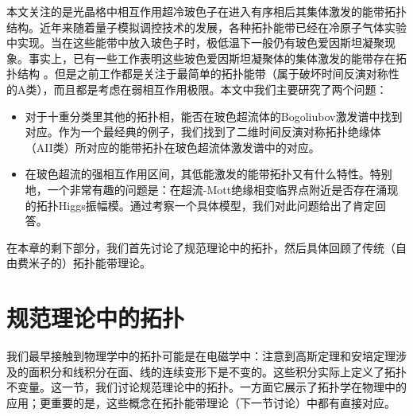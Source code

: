 本文关注的是光晶格中相互作用超冷玻色子在进入有序相后其集体激发的能带拓扑结构。近年来随着量子模拟调控技术的发展，各种拓扑能带已经在冷原子气体实验中实现\cite{Goldman2016,Cooper2019}。当在这些能带中放入玻色子时，极低温下一般仍有玻色爱因斯坦凝聚现象。事实上，已有一些工作表明这些玻色爱因斯坦凝聚体的集体激发的能带存在拓扑结构 \cite{Furukawa2015,Xu2016,Liberto2016}。但是之前工作都是关注于最简单的拓扑能带（属于破坏时间反演对称性的A类），而且都是考虑在弱相互作用极限。本文中我们主要研究了两个问题：
\begin{itemize}
    \item 对于十重分类里其他的拓扑相，能否在玻色超流体的Bogoliubov激发谱中找到对应。作为一个最经典的例子，我们找到了二维时间反演对称拓扑绝缘体（AII类）所对应的能带拓扑在玻色超流体激发谱中的对应。
    \item 在玻色超流的强相互作用区间，其低能激发的能带拓扑又有什么特性。特别地，一个非常有趣的问题是：在超流-Mott绝缘相变临界点附近是否存在涌现的拓扑Higgs振幅模。通过考察一个具体模型，我们对此问题给出了肯定回答。
\end{itemize}
在本章的剩下部分，我们首先讨论了规范理论中的拓扑，然后具体回顾了传统（自由费米子的）拓扑能带理论。

\section{规范理论中的拓扑}
我们最早接触到物理学中的拓扑可能是在电磁学中：注意到高斯定理和安培定理涉及的面积分和线积分在面、线的连续变形下是不变的。这些积分实际上定义了拓扑不变量。这一节，我们讨论规范理论中的拓扑。一方面它展示了拓扑学在物理中的应用；更重要的是，这些概念在拓扑能带理论（下一节讨论）中都有直接对应。

